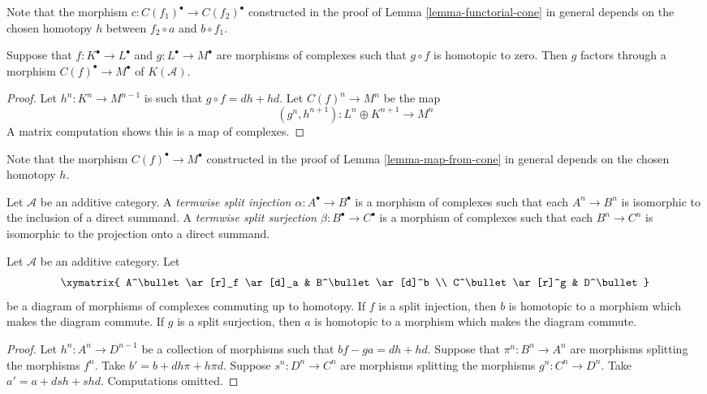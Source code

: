 \noindent
Note that the morphism $c : C(f_1)^\bullet \to C(f_2)^\bullet$
constructed in the
proof of Lemma \ref{lemma-functorial-cone} in general depends on the
chosen homotopy $h$ between $f_2 \circ a$ and $b \circ f_1$.

\begin{lemma}
\label{lemma-map-from-cone}
Suppose that $f: K^\bullet \to L^\bullet$ and $g : L^\bullet \to M^\bullet$
are morphisms of complexes such that $g \circ f$ is homotopic to zero.
Then $g$ factors through a morphism
$C(f)^\bullet \to M^\bullet$ of $K(\mathcal{A})$.
\end{lemma}

\begin{proof}
Let $h^n : K^n \to M^{n - 1}$ is such that $g \circ f = dh + hd$.
Let $C(f)^n \to M^n$ be the map
$$
(g^n, h^{n + 1}) : L^n \oplus K^{n + 1} \longrightarrow M^n
$$
A matrix computation shows this is a map of complexes.
\end{proof}

\noindent
Note that the morphism $C(f)^\bullet \to M^\bullet$
constructed in the proof of
Lemma \ref{lemma-map-from-cone} in general depends on the
chosen homotopy $h$.

\begin{definition}
\label{definition-termwise-split-map}
Let $\mathcal{A}$ be an additive category.
A {\it termwise split injection $\alpha : A^\bullet \to B^\bullet$}
is a morphism of complexes such that each $A^n \to B^n$
is isomorphic to the inclusion of a direct summand.
A {\it termwise split surjection $\beta : B^\bullet \to C^\bullet$}
is a morphism of complexes such that each $B^n \to C^n$
is isomorphic to the projection onto a direct summand.
\end{definition}

\begin{lemma}
\label{lemma-make-commute-map}
Let $\mathcal{A}$ be an additive category.
Let
$$
\xymatrix{
A^\bullet \ar[r]_f \ar[d]_a & B^\bullet \ar[d]^b \\
C^\bullet \ar[r]^g & D^\bullet
}
$$
be a diagram of morphisms of complexes commuting up to homotopy.
If $f$ is a split injection, then $b$ is homotopic to a
morphism which makes the diagram commute.
If $g$ is a split surjection, then $a$ is homotopic to a
morphism which makes the diagram commute.
\end{lemma}

\begin{proof}
Let $h^n : A^n \to D^{n - 1}$ be a collection of morphisms
such that $bf - ga = dh + hd$. Suppose that $\pi^n : B^n \to A^n$
are morphisms splitting the morphisms $f^n$.
Take $b' = b + dh\pi + h\pi d$.
Suppose $s^n : D^n \to C^n$ are morphisms splitting the morphisms
$g^n : C^n \to D^n$. Take $a' = a + dsh + shd$.
Computations omitted.
\end{proof}


